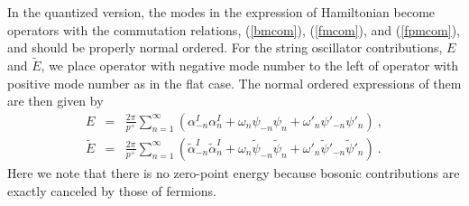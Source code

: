 \documentclass[a4paper,12pt]{article}
\numberwithin{equation}{section}
\begin{document}
In the quantized version, the modes in the expression of Hamiltonian
become operators with the commutation relations, (\ref{bmcom}),
(\ref{fmcom}), and (\ref{fpmcom}), and should be properly normal
ordered.  For the string oscillator contributions, $E$ and
$\tilde{E}$, we place operator with negative mode number to the left
of operator with positive mode number as in the flat case.  The normal
ordered expressions of them are then given by
\begin{eqnarray}
E &=& \frac{2 \pi}{p^+} \sum^\infty_{n =1}
  ( \alpha^I_{-n} \alpha^I_n
   + \omega_n \psi_{-n} \psi_n
   + \omega'_n \psi'_{-n} \psi'_n
  )~,
  \nonumber \\
\tilde{E}
  &=& \frac{2 \pi}{p^+} \sum^\infty_{n =1}
  ( \tilde{\alpha}^I_{-n} \tilde{\alpha}^I_n
   + \omega_n \tilde{\psi}_{-n} \tilde{\psi}_n
   + \omega'_n \tilde{\psi}'_{-n} \tilde{\psi}'_n
  )~.
\label{nzero-h}
\end{eqnarray}
Here we note that there is no zero-point energy because bosonic
contributions are exactly canceled by those of fermions.
\end{document}
